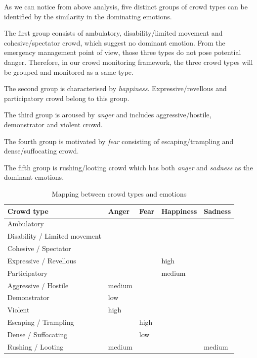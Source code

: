 As we can notice from above analysis, five distinct groups of crowd types can be identified by the similarity in the dominating emotions. 
\begin{inparaenum}[i)]
\item The first group consists of ambulatory, disability/limited movement and cohesive/spectator crowd, which suggest no dominant emotion. From the emergency management point of view, those three types do not pose potential danger. Therefore, in our crowd monitoring framework, the three crowd types will be grouped and monitored as a same type.
\item The second group is characterised by \textit{happiness}. Expressive/revellous and participatory crowd belong to this group.
\item The third group is aroused by \textit{anger} and includes aggressive/hostile, demonstrator and violent crowd.
\item The fourth group is motivated by \textit{fear} consisting of escaping/trampling and dense/suffocating crowd.
\item The fifth group is rushing/looting crowd which has both \textit{anger} and \textit{sadness} as the dominant emotions.
\end{inparaenum}

\begin{table}
\caption{Mapping between crowd types and emotions}
\label{table:mappingEmotionCrowdType}
\begin{tabular}{|p{6cm}|p{1.8cm}|p{1.8cm}|p{1.8cm}|p{1.8cm}|}
\hline
\textbf{Crowd type} & \textbf{Anger} & \textbf{Fear} & \textbf{Happiness} & \textbf{Sadness} \\
\hline
Ambulatory & & & & \\
\hline
Disability / Limited movement & & & & \\
\hline
Cohesive / Spectator & & & & \\
\hline
Expressive / Revellous & & & high & \\
\hline
Participatory & & & medium & \\
\hline
Aggressive / Hostile & medium & & & \\
\hline
Demonstrator & low &  &  & \\
\hline
Violent & high & & & \\
\hline
Escaping / Trampling & & high & & \\
\hline
Dense / Suffocating	& & low & & \\
\hline
Rushing	/ Looting & medium & & & medium\\
\hline
\end{tabular}
\end{table}

